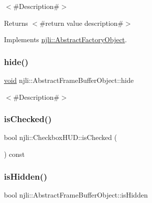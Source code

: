 $<$\#\+Description\#$>$

\begin{DoxyReturn}{Returns}
$<$\#return value description\#$>$ 
\end{DoxyReturn}


Implements \mbox{\hyperlink{classnjli_1_1_abstract_factory_object_a207c86146d40d0794708ae7f2d4e60a7}{njli\+::\+Abstract\+Factory\+Object}}.

\mbox{\label{classnjli_1_1_checkbox_h_u_d_a5d7b8b3bc421084f282343e506a6d289}} 
\subsubsection{\texorpdfstring{hide()}{hide()}}
{\footnotesize\ttfamily \mbox{\hyperlink{_thread_8h_af1e856da2e658414cb2456cb6f7ebc66}{void}} njli\+::\+Abstract\+Frame\+Buffer\+Object\+::hide}

$<$\#\+Description\#$>$ \mbox{\label{classnjli_1_1_checkbox_h_u_d_a25b48e71d20e08b4560dbcc55b3838e1}} 
\subsubsection{\texorpdfstring{is\+Checked()}{isChecked()}}
{\footnotesize\ttfamily bool njli\+::\+Checkbox\+H\+U\+D\+::is\+Checked (\begin{DoxyParamCaption}{ }\end{DoxyParamCaption}) const}

\mbox{\label{classnjli_1_1_checkbox_h_u_d_a3009efb11b4bcd56bd933c21b230a125}} 
\subsubsection{\texorpdfstring{is\+Hidden()}{isHidden()}}
{\footnotesize\ttfamily bool njli\+::\+Abstract\+Frame\+Buffer\+Object\+::is\+Hidden}

